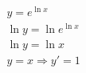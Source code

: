 \begin{ex}
\begin{align}
&y= e^{\ln{x}}\nonumber\\
&\ln{y}=\ln{e^{\ln{x}}}\nonumber\\
&\ln{y}=\ln{x}\nonumber\\
&y=x\Rightarrow y'=1\nonumber
\end{align}
\end{ex}